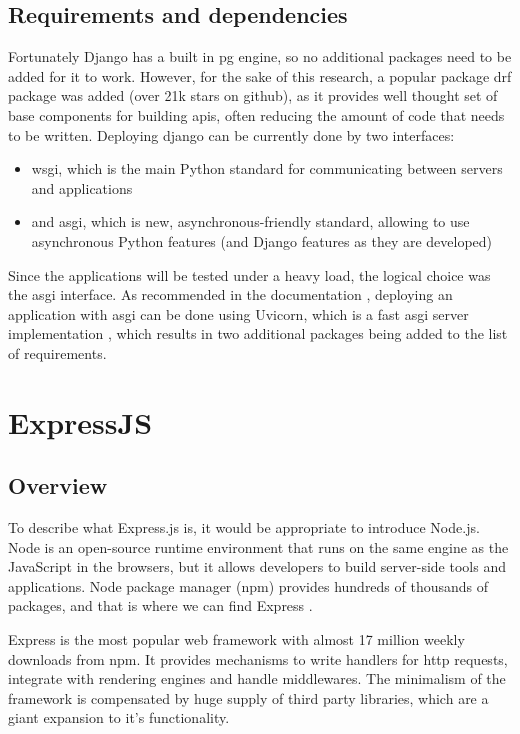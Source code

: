\subsection{Requirements and dependencies}
Fortunately Django has a built in \acrlong{pg} engine, so no additional packages need to be added for it to work. However, for the sake of this research, a popular package \acrlong{drf} package was added (over 21k stars on github), as it provides well thought set of base components for building \acrshort{api}s, often reducing the amount of code that needs to be written.
Deploying django can be currently done by two interfaces:
\begin{itemize}
  \item \acrshort{wsgi}, which is the main Python standard for communicating between servers and applications
  \item and \acrshort{asgi}, which is new, asynchronous-friendly standard, allowing to use asynchronous Python features (and Django features as they are developed) \cite{deployingDjango}
\end{itemize}

Since the applications will be tested under a heavy load, the logical choice was the \acrshort{asgi} interface. As recommended in the documentation \cite{deployingDjango}, deploying an application with \acrshort{asgi} can be done using Uvicorn, which is a fast \acrshort{asgi} server implementation \cite{uvicorn}, which results in two additional packages being added to the list of requirements.

\section{ExpressJS}

\subsection{Overview}

To describe what Express.js is, it would be appropriate to introduce Node.js. Node is an open-source runtime environment that runs on the same engine as the JavaScript in the browsers, but it allows developers to build server-side tools and applications. Node package manager (\acrshort{npm}) provides hundreds of thousands of packages, and that is where we can find Express \cite{expressIntroduction}.

Express is the most popular web framework with almost 17 million weekly downloads from \acrshort{npm}. It provides mechanisms to write handlers for \acrshort{http} requests, integrate with rendering engines and handle middlewares. The minimalism of the framework is compensated by huge supply of third party libraries, which are a giant expansion to it's functionality.

